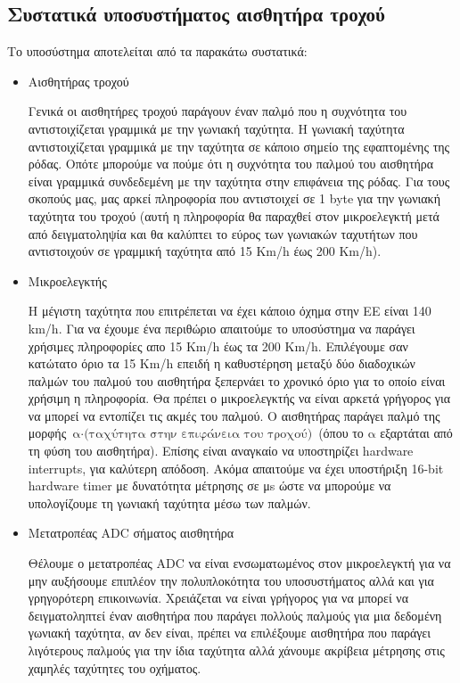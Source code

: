 \documentclass{article}
\begin{document}
\subsection{Συστατικά υποσυστήματος αισθητήρα τροχού}
Το υποσύστημα αποτελείται από τα παρακάτω συστατικά:
\begin{itemize}
\item Αισθητήρας τροχού
    \par
    Γενικά οι αισθητήρες τροχού παράγουν έναν παλμό που η συχνότητα του αντιστοιχίζεται γραμμικά με την γωνιακή ταχύτητα. Η γωνιακή ταχύτητα αντιστοιχίζεται γραμμικά με την ταχύτητα σε κάποιο σημείο της εφαπτομένης της ρόδας. Οπότε μπορούμε να πούμε ότι η συχνότητα του παλμού του αισθητήρα είναι γραμμικά συνδεδεμένη με την ταχύτητα στην επιφάνεια της ρόδας. Για τους σκοπούς μας, μας αρκεί πληροφορία που αντιστοιχεί σε 1 byte για την γωνιακή ταχύτητα του τροχού (αυτή η πληροφορία θα παραχθεί στον μικροελεγκτή μετά από δειγματοληψία και θα καλύπτει το εύρος των γωνιακών ταχυτήτων που αντιστοιχούν σε γραμμική ταχύτητα από 15 Km/h έως 200 Km/h).
\item Μικροελεγκτής
    \par
    Η μέγιστη ταχύτητα που επιτρέπεται να έχει κάποιο όχημα στην ΕΕ είναι 140 km/h. Για να έχουμε ένα περιθώριο απαιτούμε το υποσύστημα να παράγει χρήσιμες πληροφορίες απο 15 Km/h έως τα 200 Km/h. Επιλέγουμε σαν κατώτατο όριο τα 15 Km/h επειδή η καθυστέρηση μεταξύ δύο διαδοχικών παλμών του παλμού του αισθητήρα ξεπερνάει το χρονικό όριο για το οποίο είναι χρήσιμη η πληροφορία. Θα πρέπει ο μικροελεγκτής να είναι αρκετά γρήγορος για να μπορεί να εντοπίζει τις ακμές του παλμού. Ο αισθητήρας παράγει παλμό της μορφής $\text{α} \cdot \text{(ταχύτητα στην επιφάνεια του τροχού)}$ (όπου το $\text{α}$ εξαρτάται από τη φύση του αισθητήρα). Επίσης είναι αναγκαίο να υποστηρίζει hardware interrupts, για καλύτερη απόδοση. Ακόμα απαιτούμε να έχει υποστήριξη 16-bit hardware timer με δυνατότητα μέτρησης σε μs ώστε να μπορούμε να υπολογίζουμε τη γωνιακή ταχύτητα μέσω των παλμών.
 \item Μετατροπέας ADC σήματος αισθητήρα
    \par
    Θέλουμε ο μετατροπέας ADC να είναι ενσωματωμένος στον μικροελεγκτή για να μην αυξήσουμε επιπλέον την πολυπλοκότητα του υποσυστήματος αλλά και για γρηγορότερη επικοινωνία. Χρειάζεται να είναι γρήγορος για να μπορεί να δειγματοληπτεί έναν αισθητήρα που παράγει πολλούς παλμούς για μια δεδομένη γωνιακή ταχύτητα, αν δεν είναι, πρέπει να επιλέξουμε αισθητήρα που παράγει λιγότερους παλμούς για την ίδια ταχύτητα αλλά χάνουμε ακρίβεια μέτρησης στις χαμηλές ταχύτητες του οχήματος.
\end{itemize}
\end{document}
